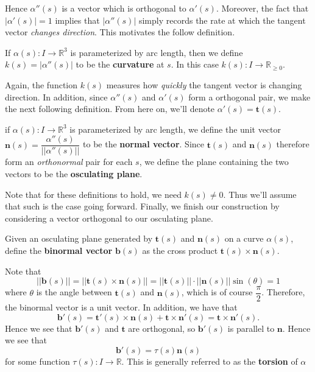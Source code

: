 \documentclass[12pt,letterpaper,boxed]{maths_v5}
\newcommand{\rr}{\mathbb{R}}
\theoremstyle{definition}
\begin{document}
Hence $\alpha''(s)$ is a vector which is orthogonal to $\alpha'(s)$. 
Moreover, the fact that $|\alpha'(s)| = 1$ implies that $|\alpha''(s)|$ simply 
records the rate at which the tangent vector \textit{changes direction}.
This motivates the follow definition.

\begin{defn}
    If $\alpha(s): I \to \rr^3$ is parameterized by arc length, then we 
    define $k(s) = |\alpha''(s)|$ to be the \textbf{curvature} at $s$. 
    In this case $k(s): I \to \rr_{\ge 0}$. 
\end{defn}

Again, the function $k(s)$ measures how \textit{quickly} 
the tangent vector is changing direction. In addition, since $\alpha''(s)$ 
and $\alpha'(s)$ form a orthogonal pair, we make the next following definition.
From here on, we'll denote $\alpha'(s) = \bm{t}(s)$. 

\begin{defn}
    if $\alpha(s): I \to \rr^3$ is parameterized by arc length, we 
    define the unit vector $\bm{n}(s) = \dfrac{\alpha''(s)}{||\alpha''(s)||}$ 
    to be the \textbf{normal vector}. 
    Since $\bm{t}(s)$ and $\bm{n}(s)$ therefore form an \textit{orthonormal} pair for 
    each $s$, we define the plane containing the two vectors to be 
    the \textbf{osculating plane}.  
\end{defn}

Note that for these definitions to hold, we need $k(s) \ne 0$. Thus we'll 
assume that such is the case going forward. Finally, we finish our construction 
by considering a vector orthogonal to our osculating plane. 

\begin{defn}
    Given an osculating plane generated by $\bm{t}(s)$ and $\bm{n}(s)$ on a 
    curve $\alpha(s)$, define the \textbf{binormal vector} $\bm{b}(s)$ as the cross 
    product $\bm{t}(s)\times \bm{n}(s)$.
\end{defn}
Note that 
\[
    ||\bm{b}(s)|| = ||\bm{t}(s) \times \bm{n}(s)|| = ||\bm{t}(s)|| \cdot ||\bm{n}(s)|| \sin(\theta) = 1
\]
where $\theta$ is the angle between $\bm{t}(s)$ and $\bm{n}(s)$, which is of course 
$\dfrac{\pi}{2}$. Therefore, the binormal vector is a unit vector. In addition, we have that 
\[
    \bm{b}'(s) = \bm{t}'(s) \times \bm{n}(s) + \bm{t}\times \bm{n}'(s) 
    = 
    \bm{t}\times \bm{n}'(s).
\]  
Hence we see that $\bm{b}'(s)$ and $\bm{t}$ are orthogonal, so 
$\bm{b}'(s)$ is parallel to $\bm{n}$. Hence we see that 
\[
    \bm{b}'(s) = \tau(s)\bm{n}(s)
\]
for some function $\tau(s): I \to \rr$. This is generally referred to as the 
\textbf{torsion} of $\alpha$ 
\end{document}
